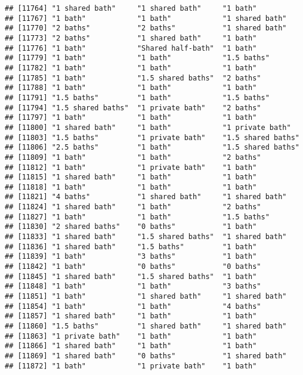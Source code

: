 \documentclass[
]{article}
\begin{document}
\begin{verbatim}
## [11764] "1 shared bath"     "1 shared bath"     "1 bath"           
## [11767] "1 bath"            "1 bath"            "1 shared bath"    
## [11770] "2 baths"           "2 baths"           "1 shared bath"    
## [11773] "2 baths"           "1 shared bath"     "1 bath"           
## [11776] "1 bath"            "Shared half-bath"  "1 bath"           
## [11779] "1 bath"            "1 bath"            "1.5 baths"        
## [11782] "1 bath"            "1 bath"            "1 bath"           
## [11785] "1 bath"            "1.5 shared baths"  "2 baths"          
## [11788] "1 bath"            "1 bath"            "1 bath"           
## [11791] "1.5 baths"         "1 bath"            "1.5 baths"        
## [11794] "1.5 shared baths"  "1 private bath"    "2 baths"          
## [11797] "1 bath"            "1 bath"            "1 bath"           
## [11800] "1 shared bath"     "1 bath"            "1 private bath"   
## [11803] "1.5 baths"         "1 private bath"    "1.5 shared baths" 
## [11806] "2.5 baths"         "1 bath"            "1.5 shared baths" 
## [11809] "1 bath"            "1 bath"            "2 baths"          
## [11812] "1 bath"            "1 private bath"    "1 bath"           
## [11815] "1 shared bath"     "1 bath"            "1 bath"           
## [11818] "1 bath"            "1 bath"            "1 bath"           
## [11821] "4 baths"           "1 shared bath"     "1 shared bath"    
## [11824] "1 shared bath"     "1 bath"            "2 baths"          
## [11827] "1 bath"            "1 bath"            "1.5 baths"        
## [11830] "2 shared baths"    "0 baths"           "1 bath"           
## [11833] "1 shared bath"     "1.5 shared baths"  "1 shared bath"    
## [11836] "1 shared bath"     "1.5 baths"         "1 bath"           
## [11839] "1 bath"            "3 baths"           "1 bath"           
## [11842] "1 bath"            "0 baths"           "0 baths"          
## [11845] "1 shared bath"     "1.5 shared baths"  "1 bath"           
## [11848] "1 bath"            "1 bath"            "3 baths"          
## [11851] "1 bath"            "1 shared bath"     "1 shared bath"    
## [11854] "1 bath"            "1 bath"            "4 baths"          
## [11857] "1 shared bath"     "1 bath"            "1 bath"           
## [11860] "1.5 baths"         "1 shared bath"     "1 shared bath"    
## [11863] "1 private bath"    "1 bath"            "1 bath"           
## [11866] "1 shared bath"     "1 bath"            "1 bath"           
## [11869] "1 shared bath"     "0 baths"           "1 shared bath"    
## [11872] "1 bath"            "1 private bath"    "1 bath"           

\end{verbatim}
\end{document}

